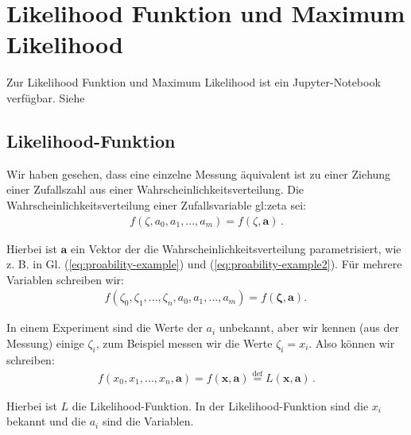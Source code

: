 \section{Likelihood Funktion und Maximum Likelihood}\label{sec:likelihood}

\begin{center}
\begin{tcolorbox}[enhanced,width=6in,center upper,
    fontupper=\large,drop fuzzy shadow southwest,
    colframe=blue!50!black,colback=blue!10]
    {Zur Likelihood Funktion und Maximum Likelihood ist ein Jupyter-Notebook verfügbar. Siehe  }
\end{tcolorbox}
\end{center}

\subsection{Likelihood-Funktion}
\label{subsec:vl8}


Wir haben gesehen, dass eine einzelne Messung äquivalent ist zu einer Ziehung einer Zufallszahl aus einer Wahrscheinlichkeitsverteilung. Die Wahrscheinlichkeitsverteilung einer Zufallsvariable \gls{gl:zeta} sei:
\begin{align}
f(\zeta, a_0, a_1, ..., a_m) = f (\zeta, \boldsymbol{a})\,.
\label{eq:vl8-1}
\end{align}

Hierbei ist $\boldsymbol{a}$ ein Vektor der die Wahrscheinlichkeitsverteilung parametrisiert, wie z. B. in Gl. (\ref{eq:proability-example}) und (\ref{eq:proability-example2}). F\"ur mehrere Variablen schreiben wir: 
\begin{align}
f(\zeta_0, \zeta_1, ..., \zeta_n, a_0, a_1, ..., a_m) = f (\boldsymbol{\zeta}, \boldsymbol{a}).\,
\label{eq:vl8-2}
\end{align}

In einem Experiment sind die Werte der $a_i$ unbekannt, aber wir kennen (aus der Messung) einige $\zeta_i$, zum Beispiel messen wir die Werte $\zeta_i = x_i$. Also k\"onnen wir schreiben:
\begin{align}
f(x_0, x_1, ..., x_n, \boldsymbol{a}) = f(\boldsymbol{x, a}) \overset{\text{def}}{=} L (\boldsymbol{x,a})\,.
\label{eq:vl8-3}
\end{align}

\begin{center}
\begin{tcolorbox}[enhanced,width=6in,drop fuzzy shadow southwest,
    colframe=red!50!black,colback=red!05]
   Hierbei ist $L$ die Likelihood-Funktion. In der Likelihood-Funktion sind die $x_i$ bekannt und die $a_i$ sind die Variablen.
\end{tcolorbox}
\end{center}


